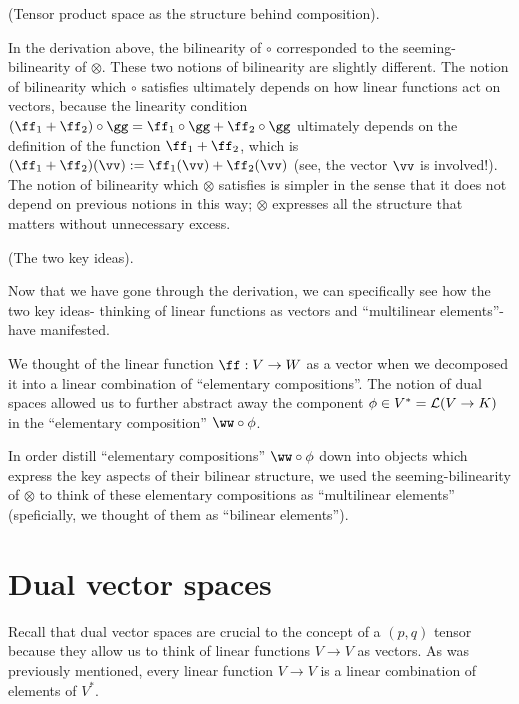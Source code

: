\begin{remark}
    (Tensor product space as the structure behind composition).
    
    In the derivation above, the bilinearity of $\circ$ corresponded to the seeming-bilinearity of $\otimes$. These two notions of bilinearity are slightly different. The notion of bilinearity which $\circ$ satisfies ultimately depends on how linear functions act on vectors, because the linearity condition $(\ff_1 + \ff_2) \circ \gg = \ff_1 \circ \gg + \ff_2 \circ \gg$ ultimately depends on the definition of the function $\ff_1 + \ff_2$, which is $(\ff_1 + \ff_2)(\vv) := \ff_1(\vv) + \ff_2(\vv)$ (see, the vector $\vv$ is involved!). The notion of bilinearity which $\otimes$ satisfies is simpler in the sense that it does not depend on previous notions in this way; $\otimes$ expresses all the structure that matters without unnecessary excess.
\end{remark}

\begin{remark}
    (The two key ideas). 
    
    Now that we have gone through the derivation, we can specifically see how the two key ideas- thinking of linear functions as vectors and ``multilinear elements''- have manifested.
    
    We thought of the linear function $\ff:V \rightarrow W$ as a vector when we decomposed it into a linear combination of ``elementary compositions''. The notion of dual spaces allowed us to further abstract away the component $\phi \in V^* = \mathcal{L}(V \rightarrow K)$ in the ``elementary composition'' $\ww \circ \phi$.
    
    In order distill ``elementary compositions'' $\ww \circ \phi$ down into objects which express the key aspects of their bilinear structure, we used the seeming-bilinearity of $\otimes$ to think of these elementary compositions as ``multilinear elements'' (speficially, we thought of them as ``bilinear elements'').
\end{remark}

\newpage

\section{Dual vector spaces}

Recall that dual vector spaces are crucial to the concept of a $(p, q)$ tensor because they allow us to think of linear functions $V \rightarrow V$ as vectors. As was previously mentioned, every linear function $V \rightarrow V$ is a linear combination of elements of $V^*$.

